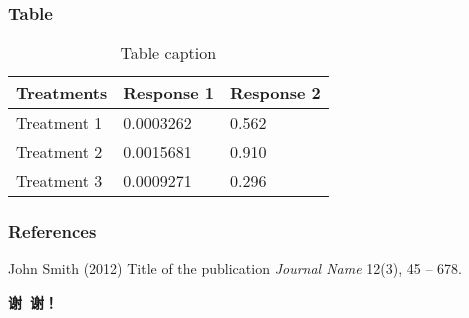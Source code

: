 \documentclass{beamer}
\theoremstyle{definition}
\numberwithin{equation}{section}
\begin{document}
    \begin{frame}
    	\frametitle{Table}
    	\begin{table}
    		\begin{tabular}{l l l}
    			\toprule
    			\textbf{Treatments} & \textbf{Response 1} & \textbf{Response 2}\\
    			\midrule
    			Treatment 1 & 0.0003262 & 0.562 \\
    			Treatment 2 & 0.0015681 & 0.910 \\
    			Treatment 3 & 0.0009271 & 0.296 \\
    			\bottomrule
    		\end{tabular}
    	    \caption{Table caption}
       \end{table}
    \end{frame}
	
	
	
	\begin{frame}
		\frametitle{References}
		\footnotesize{
			\begin{thebibliography}{99} %
				 John Smith (2012)
				\newblock Title of the publication
				\newblock \emph{Journal Name} 12(3), 45 -- 678.
			\end{thebibliography}
		}
	\end{frame}
	
	
	
	\begin{frame}
		\begin{center} {\bfseries \Large 谢\ 谢！} \end{center}
	\end{frame}
	
	
\end{document}
